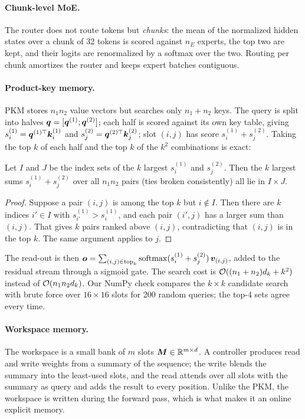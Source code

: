 \paragraph{Chunk-level MoE.} The router does not route tokens but \emph{chunks}: the mean of the
normalized hidden states over a chunk of 32 tokens is scored against $n_E$ experts, the top two are
kept, and their logits are renormalized by a softmax over the two. Routing per chunk amortizes the
router and keeps expert batches contiguous.

\paragraph{Product-key memory.} PKM \citep{c10-lample2019pkm} stores $n_1n_2$ value vectors but
searches only $n_1+n_2$ keys. The query is split into halves $\bm{q} = [\bm{q}^{(1)};\bm{q}^{(2)}]$; each
half is scored against its own key table, giving $s^{(1)}_i = \bm{q}^{(1)\top}\bm{k}^{(1)}_i$ and
$s^{(2)}_j = \bm{q}^{(2)\top}\bm{k}^{(2)}_j$; slot $(i,j)$ has score $s^{(1)}_i + s^{(2)}_j$. Taking the
top $k$ of each half and the top $k$ of the $k^2$ combinations is exact:

\begin{proposition}\label{prop:c12-pkm}
Let $I$ and $J$ be the index sets of the $k$ largest $s^{(1)}_i$ and $s^{(2)}_j$. Then the $k$
largest sums $s^{(1)}_i + s^{(2)}_j$ over all $n_1n_2$ pairs (ties broken consistently) all lie in
$I\times J$.
\end{proposition}
\begin{proof}
Suppose a pair $(i,j)$ is among the top $k$ but $i\notin I$. Then there are $k$ indices $i'\in I$
with $s^{(1)}_{i'} > s^{(1)}_i$, and each pair $(i',j)$ has a larger sum than $(i,j)$. That gives
$k$ pairs ranked above $(i,j)$, contradicting that $(i,j)$ is in the top $k$. The same argument
applies to $j$.
\end{proof}

The read-out is then $\bm{o} = \sum_{(i,j)\in\mathrm{top}_k}\operatorname{softmax}(s^{(1)}_i+s^{(2)}_j)\,\bm{v}_{(i,j)}$,
added to the residual stream through a sigmoid gate. The search cost is
$\mathcal{O}((n_1+n_2)d_k + k^2)$ instead of $\mathcal{O}(n_1n_2d_k)$. Our NumPy check compares the $k\times k$
candidate search with brute force over $16\times16$ slots for 200 random queries; the top-4 sets
agree every time.

\paragraph{Workspace memory.} The workspace is a small bank of $m$ slots $\bm{M}\in\mathbb{R}^{m\times d}$.
A controller produces read and write weights from a summary of the sequence; the write blends the
summary into the least-used slots, and the read attends over all slots with the summary as query and
adds the result to every position. Unlike the PKM, the workspace is written during the forward pass,
which is what makes it an online explicit memory.

